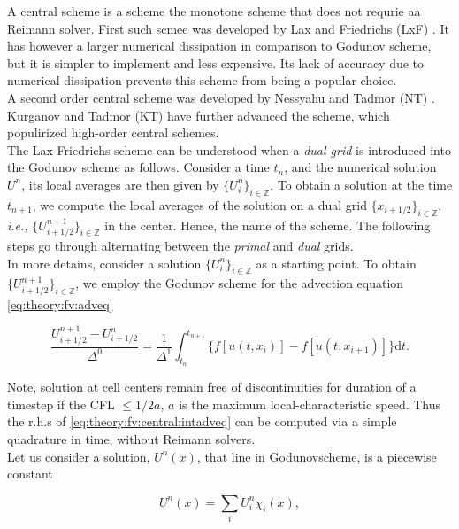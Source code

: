 \documentclass[11pt,a4paper,headinclude=true,DIV=14,BCOR=8mm,chapterprefix,listof=totoc,twoside,openright,abstracton]{scrbook}
\begin{document}
A central scheme is a scheme the monotone scheme that does not requrie aa Reimann solver. First such scmee was developed by Lax and Friedrichs (LxF) \cite{Lax:1954,Friedrichs:1954}. It has however a larger numerical dissipation in comparison to Godunov scheme, but it is simpler to implement and less expensive. Its lack of accuracy due to numerical dissipation prevents this scheme from being a popular choice. \\
A second order central scheme was developed by Nessyahu and Tadmor (NT) \cite{Nessyahu:1990}. Kurganov and Tadmor (KT) \cite{Kurganov:2000} have further advanced the scheme, which populirized high-order central schemes. \\
The Lax-Friedrichs scheme can be understood when a \textit{dual grid} is introduced into the Godunov scheme as follows. Consider a time $t_n$, and the numerical solution $U^n$, its local averages are then given by $\{U_{i}^{n}\}_{i\in \mathbb{Z}}$. To obtain a solution at the time $t_{n+1}$, we compute the local averages of the solution on a dual grid $\{x_{i+1/2}\}_{i\in\mathbb{Z}}$, \textit{i.e.,} $\{U_{i+1/2}^{n+1}\}_{i\in\mathbb{Z}}$ in the center. Hence, the name of the scheme. The following steps go through alternating between the \textit{primal} and \textit{dual} grids. \\
In more detains, consider a solution $\{U_{i}^{n}\}_{i\in \mathbb{Z}}$ as a starting point. To obtain $\{U_{i+1/2}^{n+1}\}_{i\in \mathbb{Z}}$, we employ the Godunov scheme for the advection equation \ref{eq:theory:fv:adveq} 

\begin{equation}
    \frac{U_{i+1/2}^{n+1} - U_{i+1/2}^{n}}{\Delta^0} = \frac{1}{\Delta^1}\int_{t_n}^{t_{n+1}}\big\{ f[u(t,x_i)] -f[u(t,x_{i+1})]  \big\}\text{d}t.
    \label{eq:theory:fv:central:intadveq}
\end{equation}

Note,  solution at cell centers remain free of discontinuities for duration of a timestep if the CFL $\leq 1/2 a$, $a$ is the maximum local-characteristic speed. Thus the r.h.s of \ref{eq:theory:fv:central:intadveq} can be computed via a simple quadrature in time, without Reimann solvers. \\

Let us consider a solution, $U^n(x)$, that line in Godunovscheme, is a piecewise constant 

\begin{equation}
    U^{n}(x) = \sum_i U_{i}^{n}\chi_i(x),
\end{equation}
\end{document}
